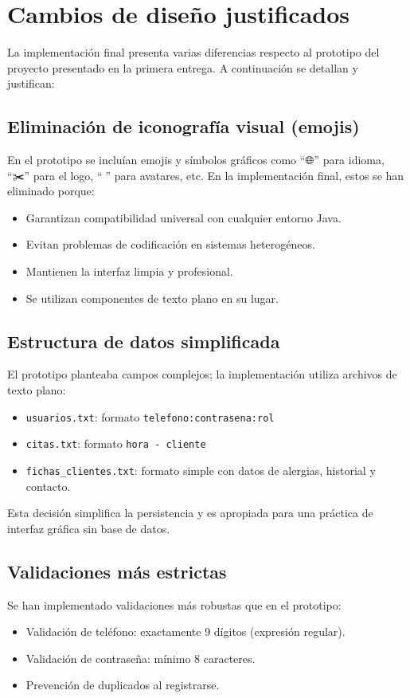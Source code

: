 \documentclass[12pt,a4paper]{report}
\begin{document}
\section{Cambios de diseño justificados}

La implementación final presenta varias diferencias respecto al prototipo del proyecto presentado en la primera entrega. A continuación se detallan y justifican:

\subsection{Eliminación de iconografía visual (emojis)}
En el prototipo se incluían emojis y símbolos gráficos como ``🌐'' para idioma, ``✂️'' para el logo, ``👤'' para avatares, etc. En la implementación final, estos se han eliminado porque:
\begin{itemize}
    \item Garantizan compatibilidad universal con cualquier entorno Java.
    \item Evitan problemas de codificación en sistemas heterogéneos.
    \item Mantienen la interfaz limpia y profesional.
    \item Se utilizan componentes de texto plano en su lugar.
\end{itemize}

\subsection{Estructura de datos simplificada}
El prototipo planteaba campos complejos; la implementación utiliza archivos de texto plano:
\begin{itemize}
    \item \texttt{usuarios.txt}: formato \texttt{telefono:contrasena:rol}
    \item \texttt{citas.txt}: formato \texttt{hora - cliente}
    \item \texttt{fichas\_clientes.txt}: formato simple con datos de alergias, historial y contacto.
\end{itemize}
Esta decisión simplifica la persistencia y es apropiada para una práctica de interfaz gráfica sin base de datos.

\subsection{Validaciones más estrictas}
Se han implementado validaciones más robustas que en el prototipo:
\begin{itemize}
    \item Validación de teléfono: exactamente 9 dígitos (expresión regular).
    \item Validación de contraseña: mínimo 8 caracteres.
    \item Prevención de duplicados al registrarse.
\end{itemize}
\end{document}
